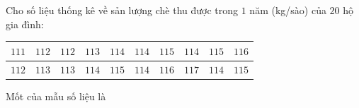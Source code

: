 \begin{ex}
Cho số liệu thống kê về sản lượng chè thu được trong $1$ năm (kg/sào) của $20$ hộ gia đình:
\begin{center}
\begin{tabular}{|c|c|c|c|c|c|c|c|c|c|}\hline
$111$ & $112$ & $112$ & $113$ & $114$ & $114$ & $115$ & $114$ & $115$ & $116$\\\hline
$112$ & $113$ & $113$ & $114$ & $115$ & $114$ & $116$ & $117$ & $114$ & $115$\\\hline
\end{tabular}
\end{center}
Mốt của mẫu số liệu là
\end{ex}
